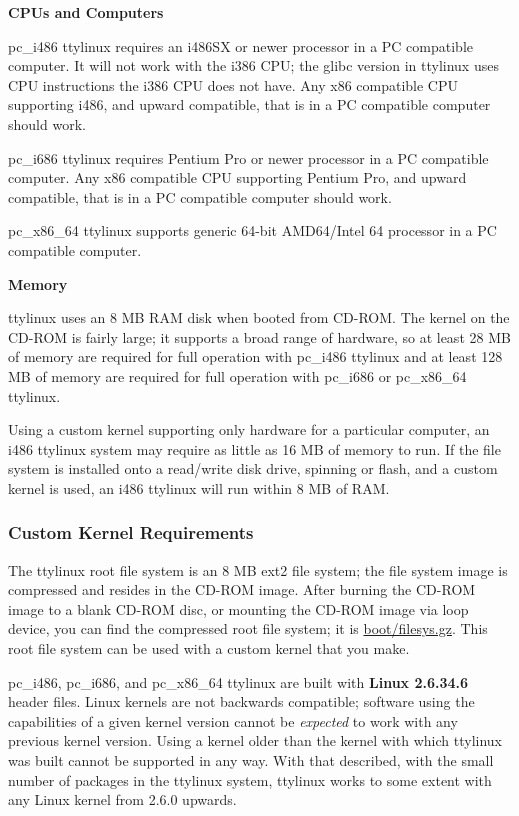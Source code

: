 \documentclass[10pt]{article}
\begin{document}
{\bf CPUs and Computers}

pc\_i486 ttylinux requires an i486SX or newer processor in a PC compatible
computer. It will not work with the i386 CPU; the glibc version in ttylinux
uses CPU instructions the i386 CPU does not have. Any x86 compatible CPU
supporting i486, and upward compatible, that is in a PC compatible computer
should work.

pc\_i686 ttylinux requires Pentium Pro or newer processor in a PC compatible
computer. Any x86 compatible CPU supporting Pentium Pro, and upward compatible,
that is in a PC compatible computer should work.

pc\_x86\_64 ttylinux supports generic 64-bit AMD64/Intel 64 processor in a PC
compatible computer.

{\bf Memory}

ttylinux uses an 8 MB RAM disk when booted from CD-ROM. The kernel on the
CD-ROM is fairly large; it supports a broad range of hardware, so at least 28
MB of memory are required for full operation with pc\_i486 ttylinux and at
least 128 MB of memory are required for full operation with pc\_i686 or
pc\_x86\_64 ttylinux.

Using a custom kernel supporting only hardware for a particular computer, an
i486 ttylinux system may require as little as 16 MB of memory to run. If the
file system is installed onto a read/write disk drive, spinning or flash, and a
custom kernel is used, an i486 ttylinux will run within 8 MB of RAM.

\subsubsection{Custom Kernel Requirements}
\label{customkernel}

The ttylinux root file system is an 8 MB ext2 file system; the file system
image is compressed and resides in the CD-ROM image. After burning the CD-ROM
image to a blank CD-ROM disc, or mounting the CD-ROM image via loop device,
you can find the compressed root file system; it is \url{boot/filesys.gz}.
This root file system can be used with a custom kernel that you make.

pc\_i486, pc\_i686, and pc\_x86\_64 ttylinux are built with
{\bf Linux 2.6.34.6} header files.  Linux kernels are not backwards compatible;
software using the capabilities of a given kernel version cannot be
{\it expected} to work with any previous kernel version. Using a kernel older
than the kernel with which ttylinux was built cannot be supported in any way.
With that described, with the small number of packages in the ttylinux system,
ttylinux works to some extent with any Linux kernel from 2.6.0 upwards.
\end{document}

